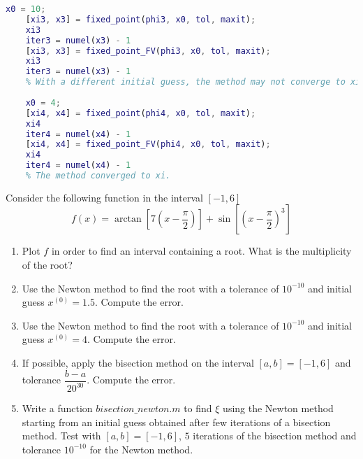 \documentclass[12pt, a4paper]{report}
\newtheorem[style=M,bodystyle=\normalfont]{theorem}{Theorem}
\newtheorem[style=M,bodystyle=\normalfont]{corollary}{Corollary}
\newtheorem[style=M,bodystyle=\normalfont]{lemma}{Lemma}
\newtheorem[style=M,bodystyle=\normalfont]{definition}{Definition}
\begin{document}
\begin{Answer}[ref=10]
\begin{lstlisting}[language=Matlab]
    x0 = 10;
    [xi3, x3] = fixed_point(phi3, x0, tol, maxit);
    xi3
    iter3 = numel(x3) - 1
    [xi3, x3] = fixed_point_FV(phi3, x0, tol, maxit);
    xi3
    iter3 = numel(x3) - 1
    % With a different initial guess, the method may not converge to xi.
    
    x0 = 4;
    [xi4, x4] = fixed_point(phi4, x0, tol, maxit);
    xi4
    iter4 = numel(x4) - 1
    [xi4, x4] = fixed_point_FV(phi4, x0, tol, maxit);
    xi4
    iter4 = numel(x4) - 1
    % The method converged to xi.
        \end{lstlisting}  
    \end{Answer}

    \newpage 

    \begin{Exercise}[label=11]
        Consider the following function in the interval $[-1, 6]$
        \[f (x) = \arctan\left[7\left(x-\dfrac{\pi}{2}\right)\right]+\sin\left[\left(x-\dfrac{\pi}{2}\right)^{3}\right]\]
        \begin{enumerate}
            \item Plot $f$ in order to find an interval containing a root. What is the multiplicity of the root?
            \item Use the Newton method to find the root with a tolerance of $10^{-10}$ and initial guess $x^{(0)}=1.5$. Compute the error.
            \item Use the Newton method to find the root with a tolerance of $10^{-10}$ and initial guess $x^{(0)}=4$. Compute the error.
            \item If possible, apply the bisection method on the interval $[a, b] = [-1, 6]$ and tolerance $\dfrac{b-a}{20^{30}}$. Compute the error.
            \item Write a function $bisection\_newton.m$ to find $\xi$ using the Newton method starting from an initial guess obtained after few iterations of a bisection method. 
                Test with $[a, b] = [-1, 6]$, $5$ iterations of the bisection method and tolerance $10^{-10}$ for the Newton method.
        \end{enumerate}
    \end{Exercise}
\end{document}
